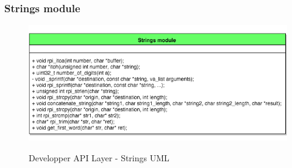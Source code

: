 \subsubsection{Strings module}

\begin{figure}[H]
\begin{center}
\includegraphics[width=1\textwidth]{includes/figures/chapter5_developper_api_layer_strings_UML.png}  \\
\caption{Developper API Layer - Strings UML}
\end{center}
\label{fig:chapter5_developper_api_layer_strings_UML}
\end{figure}


